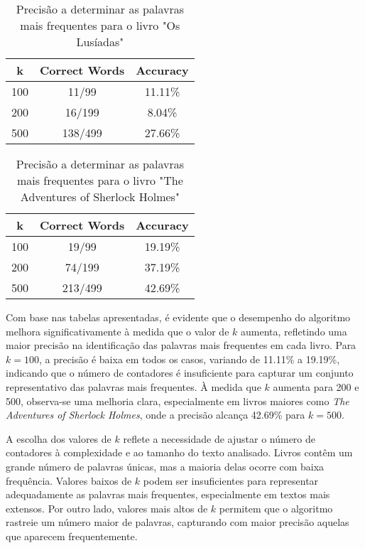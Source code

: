 \documentclass[shortpaper, portugues, times, mirror]{revdetua}
\begin{document}
\begin{table}[h!]
\centering
\begin{tabular}{|c|c|c|}
\hline
\textbf{k} & \textbf{Correct Words} & \textbf{Accuracy} \\ \hline
100 & 11/99 & 11.11\% \\ \hline
200 & 16/199 & 8.04\% \\ \hline
500 & 138/499 & 27.66\% \\ \hline
\end{tabular}
\caption{Precisão a determinar as palavras mais frequentes para o livro "Os Lusíadas"}
\label{tab:accuracy}
\end{table}

\begin{table}[h!]
\centering
\begin{tabular}{|c|c|c|}
\hline
\textbf{k} & \textbf{Correct Words} & \textbf{Accuracy} \\ \hline
100 & 19/99 & 19.19\% \\ \hline
200 & 74/199 & 37.19\% \\ \hline
500 & 213/499 & 42.69\% \\ \hline
\end{tabular}
\caption{Precisão a determinar as palavras mais frequentes para o livro "The Adventures of Sherlock Holmes"}
\label{tab:accuracy}
\end{table}

Com base nas tabelas apresentadas, é evidente que o desempenho do algoritmo melhora significativamente à medida que o valor de \(k\) aumenta, refletindo uma maior precisão na identificação das palavras mais frequentes em cada livro. Para \(k = 100\), a precisão é baixa em todos os casos, variando de 11.11\% a 19.19\%, indicando que o número de contadores é insuficiente para capturar um conjunto representativo das palavras mais frequentes. À medida que \(k\) aumenta para 200 e 500, observa-se uma melhoria clara, especialmente em livros maiores como \textit{The Adventures of Sherlock Holmes}, onde a precisão alcança 42.69\% para \(k = 500\).

A escolha dos valores de \(k\) reflete a necessidade de ajustar o número de contadores à complexidade e ao tamanho do texto analisado. Livros contêm um grande número de palavras únicas, mas a maioria delas ocorre com baixa frequência. Valores baixos de \(k\) podem ser insuficientes para representar adequadamente as palavras mais frequentes, especialmente em textos mais extensos. Por outro lado, valores mais altos de \(k\) permitem que o algoritmo rastreie um número maior de palavras, capturando com maior precisão aquelas que aparecem frequentemente.
\end{document}
